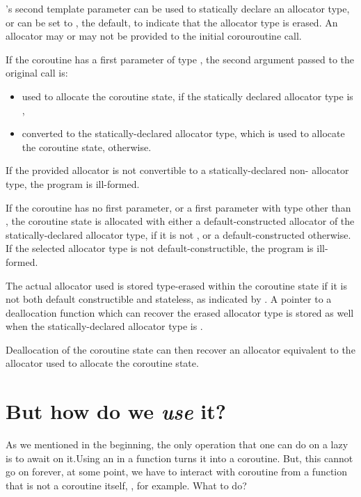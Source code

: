 's second template parameter 
can be used to statically declare an allocator type,
or can be set to , the default,
to indicate that the allocator type is erased.
An allocator may or may not be provided to the initial corouroutine call.

If the coroutine has a first parameter of type ,
the second argument  passed to the original call is:
\begin{itemize}
\item used to allocate the coroutine state,
  if the statically declared allocator type is ,
\item converted to the statically-declared allocator type,
  which is used to allocate the coroutine state, otherwise.
\end{itemize}
If the provided allocator is not convertible to a statically-declared
non- allocator type, the program is ill-formed.

If the coroutine has no first parameter,
or a first parameter with type other than ,
the coroutine state is allocated with either
a default-constructed allocator of the statically-declared allocator type,
if it is not ,
or a default-constructed  otherwise.
If the selected allocator type is not default-constructible,
the program is ill-formed.

The actual allocator used is stored type-erased within the coroutine state
if it is not both default constructible and stateless,
as indicated by .
A pointer to a deallocation function
which can recover the erased allocator type
is stored as well when the statically-declared allocator type is .

Deallocation of the coroutine state can then recover
an allocator equivalent to the allocator
used to allocate the coroutine state.

\section{But how do we \emph{use} it?}

As we mentioned in the beginning, the only operation that one can do on a lazy is to await on it.Using an  in a function turns it into a coroutine. But, this cannot go on forever, at some point, we have to interact with coroutine from a function that is not a coroutine itself, , for example. What to do?

